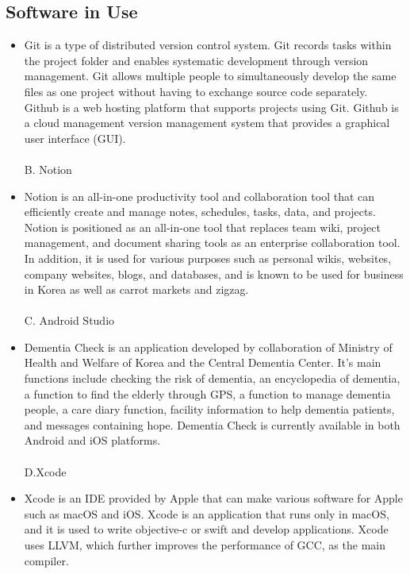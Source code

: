 \documentclass[conference]{IEEEtran}
\begin{document}
\subsection{Software in Use}\label{SCM}
\begin{itemize}
A. Git \& Github\\
\item Git is a type of distributed version control system. Git records tasks within the project folder and enables systematic development through version management. Git allows multiple people to simultaneously develop the same files as one project without having to exchange source code separately. Github is a web hosting platform that supports projects using Git. Github is a cloud management version management system that provides a graphical user interface (GUI).\\
\\
B. Notion\\
\item Notion is an all-in-one productivity tool and collaboration tool that can efficiently create and manage notes, schedules, tasks, data, and projects. Notion is positioned as an all-in-one tool that replaces team wiki, project management, and document sharing tools as an enterprise collaboration tool. In addition, it is used for various purposes such as personal wikis, websites, company websites, blogs, and databases, and is known to be used for business in Korea as well as carrot markets and zigzag.\\
\\
C. Android Studio\\
\item Dementia Check is an application developed by collaboration of Ministry of Health and Welfare of Korea and the Central Dementia Center. It’s main functions include checking the risk of dementia, an encyclopedia of dementia, a function to find the elderly through GPS, a function to manage dementia people, a care diary function, facility information to help dementia patients, and messages containing hope. Dementia Check is currently available in both Android and iOS platforms.\\
\\
D.Xcode\\
\item Xcode is an IDE provided by Apple that can make various software for Apple such as macOS and iOS. Xcode is an application that runs only in macOS, and it is used to write objective-c or swift and develop applications. Xcode uses LLVM, which further improves the performance of GCC, as the main compiler.\\

\end{itemize}
\end{document}
